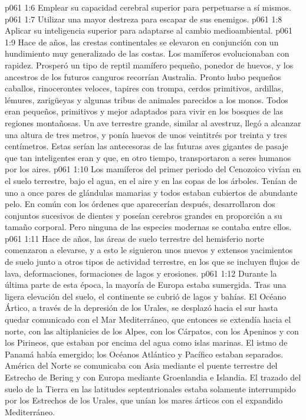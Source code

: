 \vs p061 1:6 Emplear su capacidad cerebral superior para perpetuarse a sí mismos.
\vs p061 1:7 Utilizar una mayor destreza para escapar de sus enemigos.
\vs p061 1:8 Aplicar su inteligencia superior para adaptarse al cambio medioambiental.
\vs p061 1:9 \pc Hace  de años, las crestas continentales se elevaron en conjunción con un hundimiento muy generalizado de las costas. Los mamíferos evolucionaban con rapidez. Prosperó un tipo de reptil mamífero pequeño, ponedor de huevos, y los ancestros de los futuros canguros recorrían Australia. Pronto hubo pequeños caballos, rinocerontes veloces, tapires con trompa, cerdos primitivos, ardillas, lémures, zarigüeyas y algunas tribus de animales parecidos a los monos. Todos eran pequeños, primitivos y mejor adaptados para vivir en los bosques de las regiones montañosas. Un ave terrestre grande, similar al avestruz, llegó a alcanzar una altura de tres metros, y ponía huevos de unos veintitrés por treinta y tres centímetros. Estas serían las antecesoras de las futuras aves gigantes de pasaje que tan inteligentes eran y que, en otro tiempo, transportaron a seres humanos por los aires.
\vs p061 1:10 Los mamíferos del primer periodo del Cenozoico vivían en el suelo terrestre, bajo el agua, en el aire y en las copas de los árboles. Tenían de uno a once pares de glándulas mamarias y todos estaban cubiertos de abundante pelo. En común con los órdenes que aparecerían después, desarrollaron dos conjuntos sucesivos de dientes y poseían cerebros grandes en proporción a su tamaño corporal. Pero ninguna de las especies modernas se contaba entre ellos.
\vs p061 1:11 \pc Hace  de años, las áreas de suelo terrestre del hemisferio norte comenzaron a elevarse, y a esto le siguieron unos nuevos y extensos yacimientos de suelo junto a otros tipos de actividad terrestre, en los que se incluyen flujos de lava, deformaciones, formaciones de lagos y erosiones.
\vs p061 1:12 Durante la última parte de esta época, la mayoría de Europa estaba sumergida. Tras una ligera elevación del suelo, el continente se cubrió de lagos y bahías. El Océano Ártico, a través de la depresión de los Urales, se desplazó hacia el sur hasta quedar comunicado con el Mar Mediterráneo, que entonces se extendía hacia el norte, con las altiplanicies de los Alpes, con los Cárpatos, con los Apeninos y con los Pirineos, que estaban por encima del agua como islas marinas. El istmo de Panamá había emergido; los Océanos Atlántico y Pacífico estaban separados. América del Norte se comunicaba con Asia mediante el puente terrestre del Estrecho de Bering y con Europa mediante Groenlandia e Islandia. El trazado del suelo de la Tierra en las latitudes septentrionales estaba solamente interrumpido por los Estrechos de los Urales, que unían los mares árticos con el expandido Mediterráneo.
